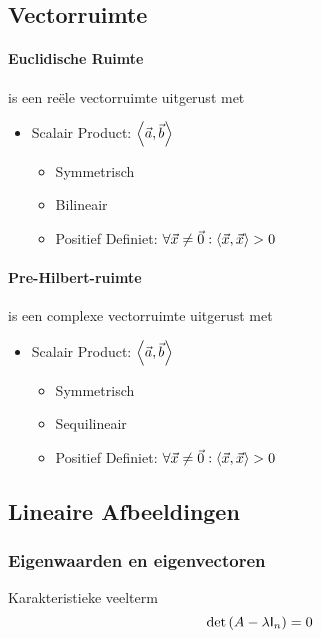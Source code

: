 
\subsection{Vectorruimte}
\label{sec:Vectorruimte}


\paragraph{Euclidische Ruimte} is een reële vectorruimte uitgerust met
\label{sec:EuclidischeRuimte}
\begin{itemize}
	\item Scalair Product: $\left\langle \vec{a},\vec{b} \right\rangle$
	\begin{itemize}
	  \item Symmetrisch
	  \item Bilineair
	  \item Positief Definiet: $\forall \vec{x} \neq \vec{0} : \left\langle \vec{x},\vec{x} \right\rangle > 0 $
  \end{itemize}
\end{itemize}

\paragraph{Pre-Hilbert-ruimte} is een complexe vectorruimte uitgerust met
\label{sec:preHilbertRuimte}
\begin{itemize}
	\item Scalair Product: $\left\langle \vec{a},\vec{b} \right\rangle$
	\begin{itemize}
	  \item Symmetrisch
	  \item Sequilineair
	  \item Positief Definiet: $\forall \vec{x} \neq \vec{0} : \left\langle \vec{x},\vec{x} \right\rangle > 0 $
  \end{itemize}\end{itemize}

\subsection{Lineaire Afbeeldingen}
\label{sec:LineaireAfbeeldingen}

\subsubsection{Eigenwaarden en eigenvectoren}
\label{sec:EigenVectWaarden}
Karakteristieke veelterm
\[
  \det{\left(A-\lambda\textsf{I}_n\right)} = 0
\]